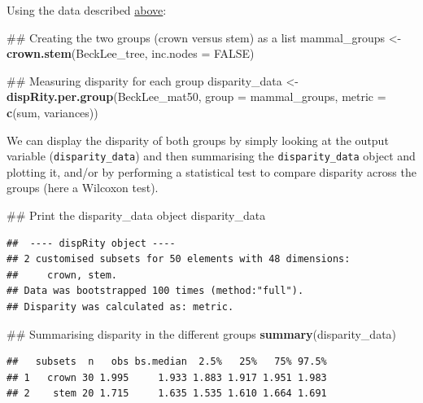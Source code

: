 \documentclass[]{book}
\newenvironment{Shaded}{\begin{snugshade}}{\end{snugshade}}
\newcommand{\KeywordTok}[1]{\textcolor[rgb]{0.13,0.29,0.53}{\textbf{#1}}}
\newcommand{\DataTypeTok}[1]{\textcolor[rgb]{0.13,0.29,0.53}{#1}}
\newcommand{\StringTok}[1]{\textcolor[rgb]{0.31,0.60,0.02}{#1}}
\newcommand{\OtherTok}[1]{\textcolor[rgb]{0.56,0.35,0.01}{#1}}
\newcommand{\NormalTok}[1]{#1}
\theoremstyle{definition}
\theoremstyle{definition}
\theoremstyle{definition}
\theoremstyle{remark}
\begin{document}
Using the \citet{beckancient2014} data described
\protect\hyperlink{example-data}{above}:

\begin{Shaded}
\begin{Highlighting}[]
\NormalTok{## Creating the two groups (crown versus stem) as a list}
\NormalTok{mammal_groups <-}\StringTok{ }\KeywordTok{crown.stem}\NormalTok{(BeckLee_tree, }\DataTypeTok{inc.nodes =} \OtherTok{FALSE}\NormalTok{)}

\NormalTok{## Measuring disparity for each group}
\NormalTok{disparity_data <-}\StringTok{ }\KeywordTok{dispRity.per.group}\NormalTok{(BeckLee_mat50, }\DataTypeTok{group =}\NormalTok{ mammal_groups,}
                                     \DataTypeTok{metric =} \KeywordTok{c}\NormalTok{(sum, variances))}
\end{Highlighting}
\end{Shaded}

We can display the disparity of both groups by simply looking at the
output variable (\texttt{disparity\_data}) and then summarising the
\texttt{disparity\_data} object and plotting it, and/or by performing a
statistical test to compare disparity across the groups (here a Wilcoxon
test).

\begin{Shaded}
\begin{Highlighting}[]
\NormalTok{## Print the disparity_data object}
\NormalTok{disparity_data}
\end{Highlighting}
\end{Shaded}

\begin{verbatim}
##  ---- dispRity object ---- 
## 2 customised subsets for 50 elements with 48 dimensions:
##     crown, stem.
## Data was bootstrapped 100 times (method:"full").
## Disparity was calculated as: metric.
\end{verbatim}

\begin{Shaded}
\begin{Highlighting}[]
\NormalTok{## Summarising disparity in the different groups}
\KeywordTok{summary}\NormalTok{(disparity_data)}
\end{Highlighting}
\end{Shaded}

\begin{verbatim}
##   subsets  n   obs bs.median  2.5%   25%   75% 97.5%
## 1   crown 30 1.995     1.933 1.883 1.917 1.951 1.983
## 2    stem 20 1.715     1.635 1.535 1.610 1.664 1.691
\end{verbatim}
\end{document}
